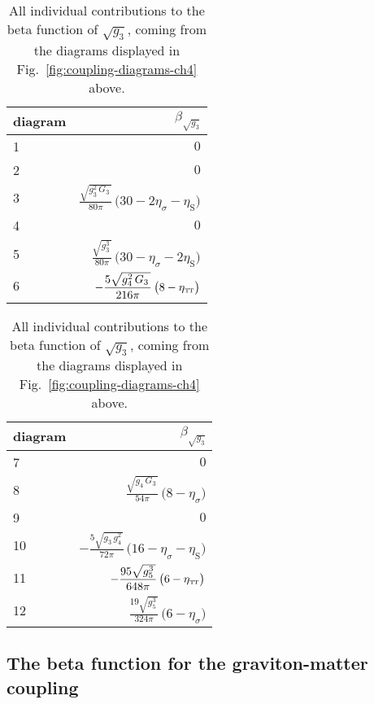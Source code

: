 \documentclass[11pt]{book} %
\newcommand\TTspace{ -1pt }
\newcommand\etaTT{ \eta_{\scriptscriptstyle{\mathrm{T\hspace{\TTspace}T}}} }
\newcommand\etaS{ \eta_{\scriptscriptstyle{\mathrm{S}}} }
\numberwithin{equation}{chapter}
\begin{document}
{
  \setlength{\extrarowheight}{10pt}
  \begin{table}[p]
    \begin{center}
      \begin{tabular}{ l r }
        \toprule
        diagram &  $\beta_{\sqrt{g_3}}$ \\
        \midrule
         1 &  $\displaystyle 0$ \\
         2 &  $\displaystyle 0$ \\
         3 &  $\displaystyle \frac{\sqrt{g_3^2 \, G_3 \,}}{80\pi} \, \big( 30 - 2\eta_\sigma - \etaS \big)$ \\
         4 &  $\displaystyle 0$ \\
         5 &  $\displaystyle \frac{\sqrt{g_3^3 \,}}{80 \pi} \, \big( 30 -\eta_\sigma - 2 \etaS \big)$ \\
         6 &  $\displaystyle -\frac{5 \sqrt{g_4^2 \, G_3 \,}}{216 \pi}  \, \big( 8 - \etaTT \big)$ \\
        \bottomrule
      \end{tabular}
      \hspace{3mm}
      \begin{tabular}{ l r }
        \toprule
        diagram &  $\beta_{\sqrt{g_3}}$ \\
        \midrule
         7 & $\displaystyle 0$ \\
         8 & $\displaystyle \frac{\sqrt{g_4 \, G_3 \,}}{54 \pi} \, \big( 8 - \eta_\sigma \big)$ \\
         9 & $\displaystyle 0$ \\
        10 & $\displaystyle -\frac{5 \sqrt{g_3 \, g_4^2 \,}}{72 \pi} \, \big( 16 - \eta_\sigma - \etaS \big)$ \\
        11 & $\displaystyle -\frac{95 \sqrt{g_5^3 \,}}{648 \pi} \, \big( 6 - \etaTT \big)$ \\
        12 & $\displaystyle \frac{19 \sqrt{g_5^3\,}}{324 \pi} \, \big( 6 - \eta_\sigma \big)$ \\
        \bottomrule
      \end{tabular}
    \end{center}
    \caption[Coordinates and critical exponents of fixed points in perturbative approximation]
    {
      All individual contributions to the beta function of $\sqrt{g_3}$,
      coming from the diagrams displayed in Fig.~\ref{fig:coupling-diagrams-ch4} above.
    }
    \label{tab:coupling-diagrams-ch4}
  \end{table}
}


\subsection{The beta function for the graviton-matter coupling}
\end{document}
